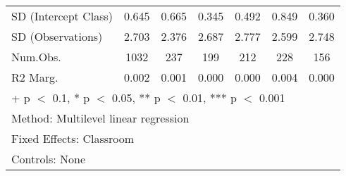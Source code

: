 \documentclass[
  letterpaper,
  DIV=11,
  numbers=noendperiod]{scrreprt}
\begin{document}
\begin{table}
\begin{tabular}[t]{lcccccc}
\hspace{1em}SD (Intercept Class) & 0.645 & 0.665 & 0.345 & 0.492 & 0.849 & 0.360\\
\hspace{1em}SD (Observations) & 2.703 & 2.376 & 2.687 & 2.777 & 2.599 & 2.748\\
\hspace{1em}Num.Obs. & 1032 & 237 & 199 & 212 & 228 & 156\\
\hspace{1em}R2 Marg. & 0.002 & 0.001 & 0.000 & 0.000 & 0.004 & 0.000\\
\bottomrule
\multicolumn{7}{l}{\rule{0pt}{1em}+ p $<$ 0.1, * p $<$ 0.05, ** p $<$ 0.01, *** p $<$ 0.001}\\
\multicolumn{7}{l}{\rule{0pt}{1em}Method: Multilevel linear regression}\\
\multicolumn{7}{l}{\rule{0pt}{1em}Fixed Effects: Classroom}\\
\multicolumn{7}{l}{\rule{0pt}{1em}Controls: None}\\
\end{tabular}
\end{table}
\end{document}
